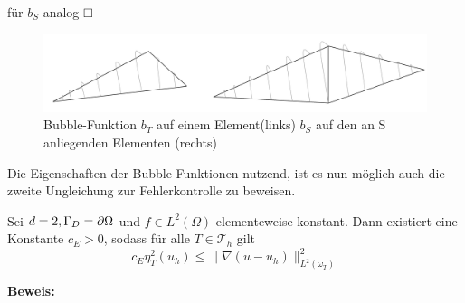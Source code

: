 für $b_S$ analog
$\hfill \Box$
\begin{figure}[!htbp]
	\begin{center}
		\includegraphics[width=16cm]{pics/bubble.png}
	\end{center}
	\caption{Bubble-Funktion $b_T$ auf einem Element(links) $b_S$ auf den an S anliegenden Elementen (rechts)}
\end{figure}
\newpage
Die Eigenschaften der Bubble-Funktionen nutzend, ist es nun möglich auch die zweite Ungleichung zur Fehlerkontrolle zu beweisen. 
\begin{theorem}
	Sei $d=2, \Gamma_D = \partial \Omega$ und $f\in L^2(\Omega)$ elementeweise konstant. Dann existiert eine Konstante $c_E > 0$, sodass für alle $T\in\mathscr{T}_h$ gilt
	\[
		c_E \eta_T^2(u_h)\leq \|\nabla (u-u_h)\|^2_{L^2(\omega_T)}
	\] 
\end{theorem}
\textbf{Beweis:}
